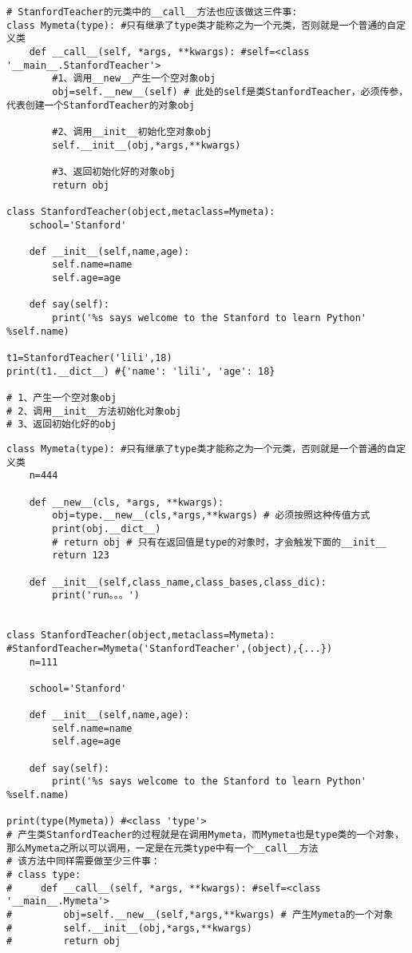 \documentclass[11pt]{article}
\begin{document}
\begin{verbatim}
# StanfordTeacher的元类中的__call__方法也应该做这三件事:
class Mymeta(type): #只有继承了type类才能称之为一个元类，否则就是一个普通的自定义类
    def __call__(self, *args, **kwargs): #self=<class '__main__.StanfordTeacher'>
        #1、调用__new__产生一个空对象obj
        obj=self.__new__(self) # 此处的self是类StanfordTeacher，必须传参，代表创建一个StanfordTeacher的对象obj

        #2、调用__init__初始化空对象obj
        self.__init__(obj,*args,**kwargs)

        #3、返回初始化好的对象obj
        return obj

class StanfordTeacher(object,metaclass=Mymeta):
    school='Stanford'

    def __init__(self,name,age):
        self.name=name
        self.age=age

    def say(self):
        print('%s says welcome to the Stanford to learn Python' %self.name)

t1=StanfordTeacher('lili',18)
print(t1.__dict__) #{'name': 'lili', 'age': 18}

# 1、产生一个空对象obj
# 2、调用__init__方法初始化对象obj
# 3、返回初始化好的obj
\end{verbatim}
\begin{verbatim}
class Mymeta(type): #只有继承了type类才能称之为一个元类，否则就是一个普通的自定义类
    n=444

    def __new__(cls, *args, **kwargs):
        obj=type.__new__(cls,*args,**kwargs) # 必须按照这种传值方式
        print(obj.__dict__)
        # return obj # 只有在返回值是type的对象时，才会触发下面的__init__
        return 123

    def __init__(self,class_name,class_bases,class_dic):
        print('run。。。')


class StanfordTeacher(object,metaclass=Mymeta): #StanfordTeacher=Mymeta('StanfordTeacher',(object),{...})
    n=111

    school='Stanford'

    def __init__(self,name,age):
        self.name=name
        self.age=age

    def say(self):
        print('%s says welcome to the Stanford to learn Python' %self.name)

print(type(Mymeta)) #<class 'type'>
# 产生类StanfordTeacher的过程就是在调用Mymeta，而Mymeta也是type类的一个对象，那么Mymeta之所以可以调用，一定是在元类type中有一个__call__方法
# 该方法中同样需要做至少三件事：
# class type:
#     def __call__(self, *args, **kwargs): #self=<class '__main__.Mymeta'>
#         obj=self.__new__(self,*args,**kwargs) # 产生Mymeta的一个对象
#         self.__init__(obj,*args,**kwargs)
#         return obj
\end{verbatim}
\end{document}
